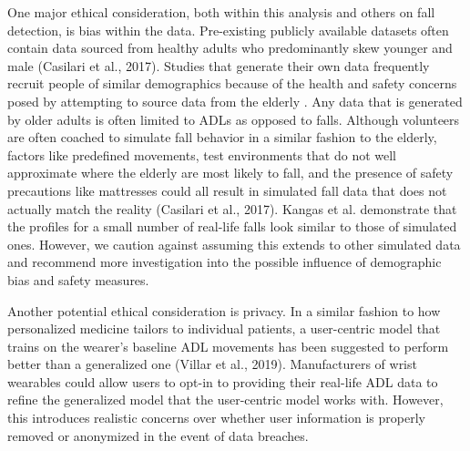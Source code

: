 \documentclass{llncs}
\begin{document}
    One major ethical consideration, both within this analysis and others on fall detection, is bias within the data. Pre-existing publicly available datasets often contain data sourced from healthy adults who predominantly skew younger and male (Casilari et al., 2017).\cite{casilari2017analysis} Studies that generate their own data frequently recruit people of similar demographics because of the health and safety concerns posed by attempting to source data from the elderly \cite{gjoreski2016accurately}. Any data that is generated by older adults is often limited to ADLs as opposed to falls. Although volunteers are often coached to simulate fall behavior in a similar fashion to the elderly, factors like predefined movements, test environments that do not well approximate where the elderly are most likely to fall, and the presence of safety precautions like mattresses could all result in simulated fall data that does not actually match the reality (Casilari et al., 2017).\cite{casilari2017analysis} Kangas et al. demonstrate that the profiles for a small number of real-life falls look similar to those of simulated ones.\cite{kangas2008comparison} However, we caution against assuming this extends to other simulated data and recommend more investigation into the possible influence of demographic bias and safety measures.
	
	Another potential ethical consideration is privacy. In a similar fashion to how personalized medicine tailors to individual patients, a user-centric model that trains on the wearer's baseline ADL movements has been suggested to perform better than a generalized one (Villar et al., 2019).\cite{villar2019online} Manufacturers of wrist wearables could allow users to opt-in to providing their real-life ADL data to refine the generalized model that the user-centric model works with. However, this introduces realistic concerns over whether user information is properly removed or anonymized in the event of data breaches.




%
%


 {}
 

\end{document}
